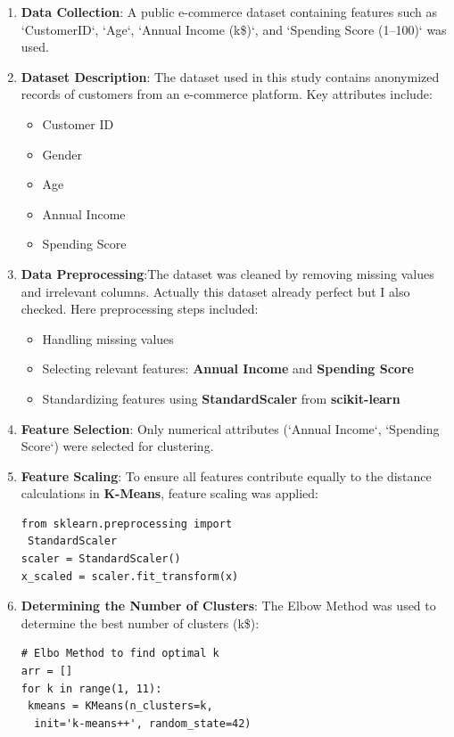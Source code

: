 \documentclass[conference]{IEEEtran}
\begin{document}
\begin{enumerate}
    \item \textbf{Data Collection}: A public e-commerce dataset containing features such as `CustomerID`, `Age`, `Annual Income (k\$)`, and `Spending Score (1–100)` was used.
    \item \textbf{Dataset Description}: The dataset used in this study contains anonymized records of customers from an e-commerce platform. Key attributes include:
        \begin{itemize}
          \item Customer ID
          \item Gender
          \item Age
          \item Annual Income
          \item Spending Score
        \end{itemize}
    \item \textbf{Data Preprocessing}:The dataset was cleaned by removing missing values and irrelevant columns. Actually this dataset already perfect but I also checked. Here preprocessing steps included:
        \begin{itemize}
          \item Handling missing values
          \item Selecting relevant features: \textbf{Annual Income} and \textbf{Spending Score}
          \item  Standardizing features using \textbf{StandardScaler} from \textbf{scikit-learn}
        \end{itemize}
    \item \textbf{Feature Selection}: Only numerical attributes (`Annual Income`, `Spending Score`) were selected for clustering.
    \item \textbf{Feature Scaling}: To ensure all features contribute equally to the distance calculations in \textbf{K-Means}, feature scaling was applied:
\begin{verbatim}
from sklearn.preprocessing import
 StandardScaler
scaler = StandardScaler()
x_scaled = scaler.fit_transform(x)
\end{verbatim}
    \item \textbf{Determining the Number of Clusters}: The Elbow Method was used to determine the best number of clusters (k\$):
\begin{verbatim}
# Elbo Method to find optimal k
arr = []
for k in range(1, 11):
 kmeans = KMeans(n_clusters=k,
  init='k-means++', random_state=42)
  

\end{verbatim}
\end{enumerate}
\end{document}
